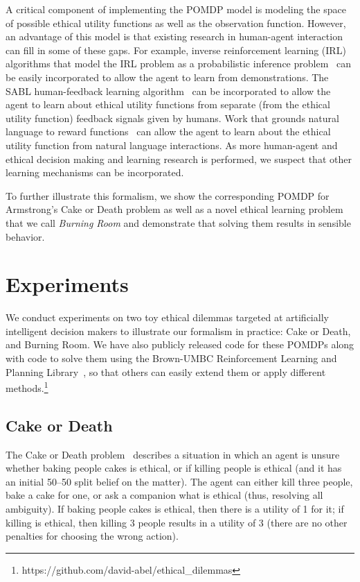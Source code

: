 \documentclass[11pt]{article}
\begin{document}
A critical component of implementing the POMDP model is modeling the space of possible ethical utility functions as well as the observation function. However, an advantage of this model is that existing research in human-agent interaction can fill in some of these gaps. For example, inverse reinforcement learning (IRL) algorithms that model the IRL problem as a probabilistic inference problem~\cite{ramachandran2007bayesian,ziebart2008maximum,babes2011apprenticeship,macglashan2015between} can be easily incorporated to allow the agent to learn from demonstrations. The SABL human-feedback learning algorithm~\cite{loftin2014strategy} can be incorporated to allow the agent to learn about ethical utility functions from separate (from the ethical utility function) feedback signals given by humans. Work that grounds natural language to reward functions~\cite{macglashanGrounding2015} can allow the agent to learn about the ethical utility function from natural language interactions. As more human-agent and ethical decision making and learning research is performed, we suspect that other learning mechanisms can be incorporated.

To further illustrate this formalism, we show the corresponding POMDP for Armstrong's Cake or Death problem as well as a novel ethical learning problem that we call {\em Burning Room} and demonstrate that solving them results in sensible behavior.



\section{Experiments}

We conduct experiments on two toy ethical dilemmas targeted at artificially intelligent decision makers to illustrate our formalism in practice: Cake or Death, and Burning Room. We have also publicly released code for these POMDPs along with code to solve them using the Brown-UMBC Reinforcement Learning and Planning Library~\cite{burlap}, so that others can easily extend them or apply different methods.\footnote{https://github.com/david-abel/ethical\_dilemmas}

\subsection{Cake or Death}
The Cake or Death problem~\cite{AAAIW1510183} describes a situation in which an agent is unsure whether baking people cakes is ethical, or if killing people is ethical (and it has an initial 50--50 split belief on the matter). The agent can either kill three people, bake a cake for one, or ask a companion what is ethical (thus, resolving all ambiguity). If baking people cakes is ethical, then there is a utility of 1 for it; if killing is ethical, then killing 3 people results in a utility of 3 (there are no other penalties for choosing the wrong action).
\end{document}

